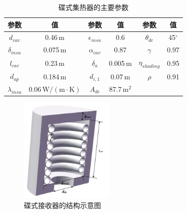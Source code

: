 \begin{table}[htbp]
\setlength{\abovecaptionskip}{0pt}
	\caption{碟式集热器的主要参数}
	\centering
	\begin{tabular}{cccccc}
		\toprule
		参数		&	值	&	参数		&	值	&	参数		&	值\\
		\midrule
		$d_{cav}$	&	0.46$\,\mathrm{m}$	&	$\epsilon_{insu}$	&	0.6	&	$\theta_{dc}$	&	45$^\circ$\\
		$\delta_{insu}$	&	0.075$\,\mathrm{m}$	&	$\alpha_{cav}$	&	0.87	&	$\gamma$	&	0.97\\
		$l_{cav}$	&	0.23$\,\mathrm{m}$	&	$\delta_a$		&	0.005$\,\mathrm{m}$	&	$\eta_{shading}$	&	0.95\\
		$d_{ap}$	&	0.184$\,\mathrm{m}$	&	$d_{i,1}$	&	0.07$\,\mathrm{m}$	&	$\rho$	&	0.91\\
		$\lambda_{insu}$	&	0.06$\,\mathrm{W/(m\cdot K)}$	&	$A_{dc}$	&	87.7$\,\mathrm{m^2}$	&	\\		
		\bottomrule
	\end{tabular}
	\label{tab:dc}
\end{table}

\begin{figure}[!ht]
\centering
\includegraphics[width=0.4\textwidth]{fig/DishReceiver.pdf}
\caption{碟式接收器的结构示意图}\label{fig:dishReceiver}
\end{figure}

